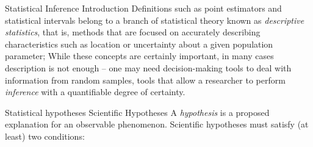 \documentclass[t]{beamer}
\begin{document}

\begin{ftst}
{Statistical Inference}
{Introduction}
Definitions such as point estimators and statistical intervals belong to a branch of statistical theory known as \textit{descriptive statistics}, that is, methods that are focused on accurately describing characteristics such as location or uncertainty about a given population parameter;
\vone
While these concepts are certainly important, in many cases description is not enough -- one may need decision-making tools to deal with information from random samples, tools that allow a researcher to perform \textit{inference} with a quantifiable degree of certainty.
\end{ftst}


\begin{ftst}
{Statistical hypotheses}
{Scientific Hypotheses}
A \textit{hypothesis} is a proposed explanation for an observable phenomenon.
\vone
Scientific hypotheses must satisfy (at least) two conditions:


\end{ftst}
\end{document}
